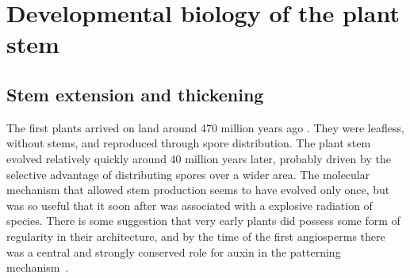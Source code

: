 \chapter[Developmental biology of the plant]{Developmental biology of the plant stem}
\label{ch:developmental}
\label{sec:bio}
\section{Stem extension and thickening}
The first plants arrived on land around 470 million years ago \cite{ingrouillePlantsDiversityEvolution2006,harrisonOriginEarlyEvolution2018}. They were leafless, without stems, and reproduced through spore distribution. The plant stem evolved relatively quickly around 40 million years later, probably driven by the selective advantage of distributing spores over a wider area.
The molecular mechanism that allowed stem production seems to have evolved only once, but was so useful that it soon after was associated with a explosive radiation of species. There is some suggestion that very early plants did possess some form of regularity in their architecture, and by the time of the first angiosperms there was a central and strongly conserved role for auxin in the patterning mechanism~\cite{reinhardtLawOrderPlants2022}. 

